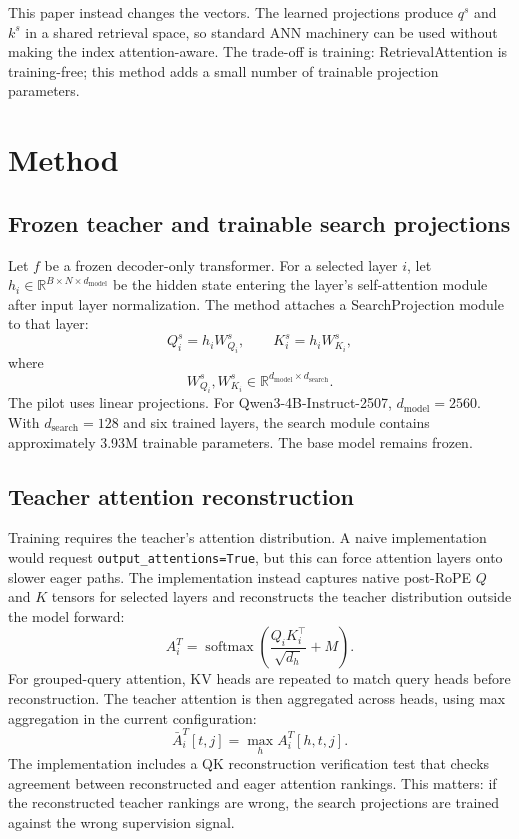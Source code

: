 \documentclass[10pt]{article}
\begin{document}
This paper instead changes the vectors. The learned projections produce $q^s$
and $k^s$ in a shared retrieval space, so standard ANN machinery can be used
without making the index attention-aware. The trade-off is training:
RetrievalAttention is training-free; this method adds a small number of
trainable projection parameters.

\section{Method}
\subsection{Frozen teacher and trainable search projections}
Let $f$ be a frozen decoder-only transformer. For a selected layer $i$, let
$h_i\in\mathbb{R}^{B\times N\times d_{\mathrm{model}}}$ be the hidden state
entering the layer's self-attention module after input layer normalization. The
method attaches a SearchProjection module to that layer:
\begin{equation}
    Q_i^s = h_i W_{Q_i}^s,\qquad K_i^s = h_i W_{K_i}^s,
\end{equation}
where
\begin{equation}
    W_{Q_i}^s,W_{K_i}^s\in\mathbb{R}^{d_{\mathrm{model}}\times d_{\mathrm{search}}}.
\end{equation}
The pilot uses linear projections. For Qwen3-4B-Instruct-2507,
$d_{\mathrm{model}}=2560$. With $d_{\mathrm{search}}=128$ and six trained
layers, the search module contains approximately 3.93M trainable parameters.
The base model remains frozen.

\subsection{Teacher attention reconstruction}
Training requires the teacher's attention distribution. A naive implementation
would request \texttt{output\_attentions=True}, but this can force attention
layers onto slower eager paths. The implementation instead captures native
post-RoPE $Q$ and $K$ tensors for selected layers and reconstructs the teacher
distribution outside the model forward:
\begin{equation}
    A_i^T=\operatorname{softmax}\left(\frac{Q_iK_i^\top}{\sqrt{d_h}}+M\right).
\end{equation}
For grouped-query attention, KV heads are repeated to match query heads before
reconstruction. The teacher attention is then aggregated across heads, using
max aggregation in the current configuration:
\begin{equation}
    \bar{A}_i^T[t,j]=\max_h A_i^T[h,t,j].
\end{equation}
The implementation includes a QK reconstruction verification test that checks
agreement between reconstructed and eager attention rankings. This matters: if
the reconstructed teacher rankings are wrong, the search projections are trained
against the wrong supervision signal.
\end{document}
